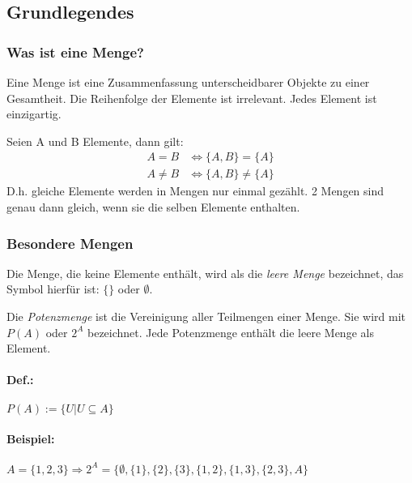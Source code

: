 \subsection{Grundlegendes}
\subsubsection*{Was ist eine Menge?}
Eine Menge ist eine Zusammenfassung unterscheidbarer Objekte zu einer
Gesamtheit. Die Reihenfolge der Elemente ist irrelevant. Jedes Element ist
einzigartig.

Seien A und B Elemente, dann gilt:
\begin{align}
  A = B    &\Leftrightarrow \{A, B\} = \{A\} \\
  A \neq B &\Leftrightarrow \{A, B\} \neq \{A\}
\end{align}
D.h. gleiche Elemente werden in Mengen nur einmal gezählt.
2 Mengen sind genau dann gleich, wenn sie die selben Elemente
enthalten.
\subsubsection*{Besondere Mengen}
Die Menge, die keine Elemente enthält, wird als die \emph{leere Menge}
bezeichnet, das Symbol hierfür ist: $\{\}$ oder ${}\emptyset$.

Die \emph{Potenzmenge} ist die Vereinigung aller Teilmengen einer Menge.
Sie wird mit \(P(A)\) oder \(2^A\) bezeichnet. Jede Potenzmenge
enthält die leere Menge als Element.

\paragraph{Def.:} $P(A):= \{ U| {U}\subseteq{A} \}$
\paragraph{Beispiel:}
\begin{math}
{A = \{1,2,3\} }
\Rightarrow{2^A = \{ \emptyset, \{1\},\{2\},\{3\},\{1,2\},\{1,3\},\{2,3\}, A \} }
\end{math}